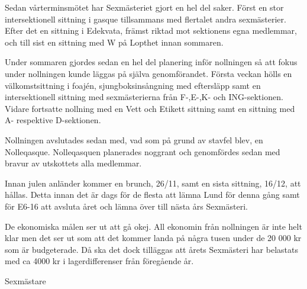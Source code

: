 \documentclass[../_main/handlingar.tex]{subfiles}
\begin{document}

Sedan vårterminsmötet har Sexmästeriet gjort en hel del saker. Först en stor intersektionell sittning i gasque tillsammans med flertalet andra sexmästerier. Efter det en sittning i Edekvata, främst riktad mot sektionens egna medlemmar, och till sist en sittning med W på Lopthet innan sommaren.

Under sommaren gjordes sedan en hel del planering inför nollningen så att fokus under nollningen kunde läggas på själva genomförandet. Första veckan hölls en välkomstsittning i foajén, sjungboksinsångning med eftersläpp samt en intersektionell sittning med sexmästerierna från F-,E-,K- och ING-sektionen. Vidare fortsatte nollning med en Vett och Etikett sittning samt en sittning med A- respektive D-sektionen.

Nollningen avslutades sedan med, vad som på grund av stavfel blev, en Nolleqasque. Nolleqasquen planerades noggrant och genomfördes sedan med bravur av utskottets alla medlemmar.

Innan julen anländer kommer en brunch, 26/11, samt en sista sittning, 16/12, att hållas. Detta innan det är dags för de flesta att lämna Lund för denna gång samt för E6-16 att avsluta året och lämna över till nästa års Sexmästeri.

De ekonomiska målen ser ut att gå okej. All ekonomin från nollningen är inte helt klar men det ser ut som att det kommer landa på några tusen under de 20 000 kr som är budgeterade. Då ska det dock tilläggas att årets Sexmästeri har belastats med ca 4000 kr i lagerdifferenser från föregående år.

\begin{signatures}{1}
    \mvh
    \signature{Martin Gemborn Nilsson}{Sexmästare}
\end{signatures}
\end{document}
